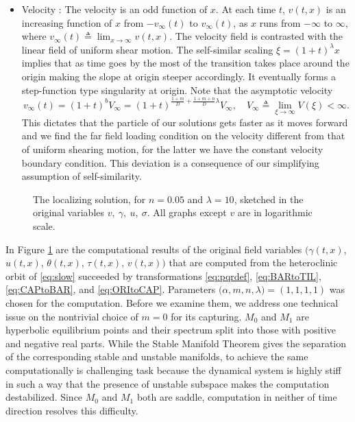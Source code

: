\documentclass[a4paper,11pt]{article}
\def\red{\color{red}}
\theoremstyle{remark}
\begin{document}
\begin{itemize}
\item Velocity : The velocity is an odd function of $x$. At each time $t$, $v(t,x)$ is an increasing function of $x$ from $-v_\infty(t)$ to $v_\infty(t)$, as $x$ runs from $-\infty$ to $\infty$, where $v_\infty(t)\triangleq \lim_{x \rightarrow \infty} v(t,x)$. The velocity field is contrasted with the linear field of uniform shear motion. The self-similar scaling  $\xi=(1+t)^\lambda x$ implies that as time goes by the most of the transition takes place around the origin making the slope at origin steeper accordingly. It eventually forms a step-function type singularity at origin. Note that the asymptotic velocity $$v_\infty(t)=(1+t)^{b}V_\infty = (1+t)^{\frac{1+m}{D} + \frac{1+m+n}{D}\lambda}V_\infty, \quad V_\infty \triangleq \lim_{\xi \rightarrow \infty} V(\xi) <\infty.$$
This dictates that the particle of our solutions gets faster as it moves forward and we find the far field loading condition on the velocity different from that of uniform shearing motion, for the latter we have the constant velocity boundary condition. This deviation is a consequence of our simplifying assumption of self-similarity.
\end{itemize}

\begin{figure}[ht]
 \centering
 \subfigure[{\red temperature ($\theta$)}]{
 \texttt{[image: strain\_rate\_log]} \label{fig:theta}
 }
\caption{The localizing solution, for $n=0.05$ and $\lambda =10$, sketched in the original variables $v,\ \gamma, \ u, \ \sigma$.
All graphs except $v$ are in logarithmic scale.} \label{fig:computation}
\end{figure}

In Figure \ref{fig:computation} are the computational results of the original field variables $\big(\gamma(t,x)$, $u(t,x)$, $\theta(t,x)$, $\tau(t,x)$, $v(t,x)\big)$ that are computed from the heteroclinic orbit of \eqref{eq:slow} succeeded by transformations \eqref{eq:pqrdef}, \eqref{eq:BARtoTIL}, \eqref{eq:CAPtoBAR}, and \eqref{eq:ORItoCAP}. Parameters $\big(\alpha,m,n,\lambda)=(1,1,1,1)$ was chosen for the computation. Before we examine them, we address one technical issue on the nontrivial choice of $m=0$ for its capturing. $M_0$ and $M_1$ are hyperbolic equilibrium points and their spectrum split into those with positive and negative real parts. While the Stable Manifold Theorem gives the separation of the corresponding stable and unstable manifolds, to achieve the same computationally is challenging task because the dynamical system is highly stiff in such a way that the presence of unstable subspace makes the computation destabilized. Since $M_0$ and $M_1$ both are saddle, computation in neither of time direction resolves this difficulty. 
\end{document}
